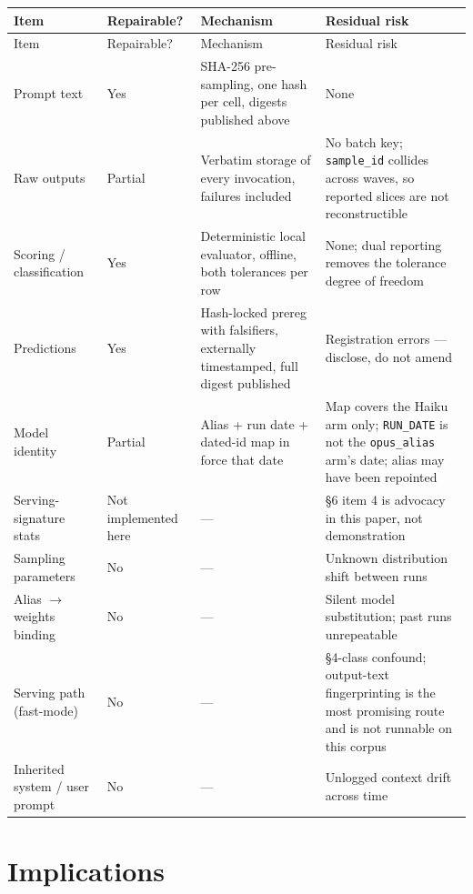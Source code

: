 \documentclass[11pt]{article}
\begin{document}
\begingroup
\small
\setlength{\LTpre}{\medskipamount}
\setlength{\LTpost}{\medskipamount}
\begin{longtable}{@{}p{}p{}p{}p{}@{}}
\toprule
Item & Repairable? & Mechanism & Residual risk \\
\midrule
\endfirsthead
\toprule
Item & Repairable? & Mechanism & Residual risk \\
\midrule
\endhead
\bottomrule
\endfoot
Prompt text & Yes & SHA-256 pre-sampling, one hash per cell, digests published above & None \\
\addlinespace
Raw outputs & Partial & Verbatim storage of every invocation, failures included & No batch key; \texttt{sample\_id} collides across waves, so reported slices are not reconstructible \\
\addlinespace
Scoring / classification & Yes & Deterministic local evaluator, offline, both tolerances per row & None; dual reporting removes the tolerance degree of freedom \\
\addlinespace
Predictions & Yes & Hash-locked prereg with falsifiers, externally timestamped, full digest published & Registration errors --- disclose, do not amend \\
\addlinespace
Model identity & Partial & Alias + run date + dated-id map in force that date & Map covers the Haiku arm only; \texttt{RUN\_DATE} is not the \texttt{opus\_alias} arm's date; alias may have been repointed \\
\addlinespace
Serving-signature stats & Not implemented here & --- & \S6 item 4 is advocacy in this paper, not demonstration \\
\addlinespace
Sampling parameters & No & --- & Unknown distribution shift between runs \\
\addlinespace
Alias $\rightarrow$ weights binding & No & --- & Silent model substitution; past runs unrepeatable \\
\addlinespace
Serving path (fast-mode) & No & --- & \S4-class confound; output-text fingerprinting is the most promising route and is not runnable on this corpus \\
\addlinespace
Inherited system / user prompt & No & --- & Unlogged context drift across time
\end{longtable}
\endgroup

\section{Implications}
\end{document}

